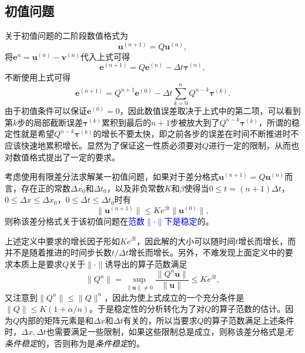 \documentclass[a4paper,10pt]{ctexart}
\begin{document}
\subsection{初值问题}
关于初值问题的二阶段数值格式为
\[
    \bm{u}^{(n+1)} = Q \bm{u}^{(n)},
\]
将$ \bm{e}^{n} = \bm{u}^{(n)} - \bm{v}^{(n)} $代入上式可得
\begin{equation}
    \bm{e}^{(n+1)} = Q \bm{e}^{(n)} - \Delta t\bm{\tau}^{(n)},
\end{equation}
不断使用上式可得
\begin{equation}
    \bm{e}^{(n+1)} = Q^{n+1} \bm{e}^{(0)} - \Delta t\sum_{k=0}^n Q^{n-k} \bm{\tau}^{(k)}.
\end{equation}
由于初值条件可以保证$ \bm{e}^{(0)} = 0 $，因此数值误差取决于上式中的第二项，可以看到第$ k $步的局部截断误差$ \bm{\tau}^{(k)} $累积到最后的$ n+1 $步被放大到了$ Q^{n-k} \bm{\tau}^{(k)} $，所谓的稳定性就是希望$ Q^{n-k} \bm{\tau}^{(k)} $的增长不要太快，即之前各步的误差在时间不断推进时不应该快速地累积增长。显然为了保证这一性质必须要对$ Q $进行一定的限制，从而也对数值格式提出了一定的要求。

\begin{definition}
    考虑使用有限差分法求解某一初值问题，如果对于差分格式$ \bm{u}^{(n+1)} = Q \bm{u}^{(n)} $而言，存在正的常数$ \Delta x_0 $和$ \Delta t_0 $，以及非负常数$ K $和$ \beta $使得当$ 0\leqslant t=(n+1)\Delta t $，$ 0\leqslant \Delta x\leqslant \Delta x_0 $，$ 0\leqslant \Delta t\leqslant \Delta t_0 $时有
    \begin{equation}
        \| \bm{u}^{(n+1)} \| \leqslant K e^{\beta t} \| \bm{u}^{(0)} \| ,
    \end{equation}
    则称该差分格式关于该初值问题在\textcolor{blue}{范数$ \| \cdot \| $下是稳定}的。
\end{definition}
\noindent 上述定义中要求的增长因子形如$ K e^{\beta t} $，因此解的大小可以随时间$ t $增长而增长，而并不是随着推进的时间步长数$ t / \Delta t $增长而增长。另外，不难发现上面定义中的要求本质上是要求$ Q $关于$ \| \cdot \| $诱导出的算子范数满足
\[
    \| Q^n \| = \sup_{\| \bm{u} \| \neq 0} \frac{\| Q^n \bm{u} \|}{\| \bm{u} \|} \leqslant K e^{\beta t},
\]
又注意到$ \| Q^n \| \leqslant \| Q \|^n $，因此为使上式成立的一个充分条件是$ \| Q \|\leqslant K(1+\alpha / n) $。于是稳定性的分析转化为了对$ Q $的算子范数的估计。因为$ Q $内部的矩阵元素是和$ \Delta x $和$ \Delta t $有关的，所以当要求$ Q $的算子范数满足上述条件时，$ \Delta x,\Delta t $也需要满足一些限制，如果这些限制总是成立，则称该差分格式是\emph{无条件稳定}的，否则称为是\emph{条件稳定}的。
\end{document}
